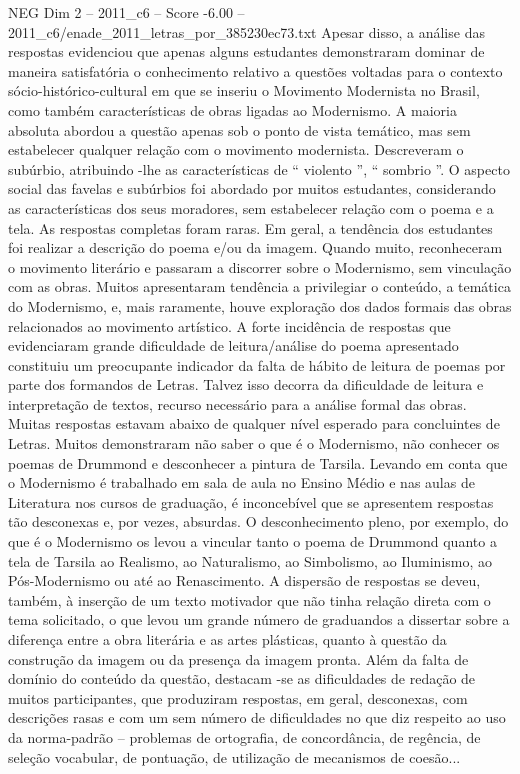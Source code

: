 \begin{textsample}{NEG Dim 2 – 2011\_c6 – Score -6.00 – 2011\_c6/enade\_2011\_letras\_por\_385230ec73.txt}
Apesar disso, a análise das respostas evidenciou que apenas alguns estudantes demonstraram dominar de maneira satisfatória o conhecimento relativo a questões voltadas para o contexto sócio-histórico-cultural em que se inseriu o Movimento Modernista no Brasil, como também características de obras ligadas ao Modernismo.
A maioria absoluta abordou a questão apenas sob o ponto de vista temático, mas sem estabelecer qualquer relação com o movimento modernista.
Descreveram o subúrbio, atribuindo -lhe as características de “ violento ”, “ sombrio ”.
O aspecto social das favelas e subúrbios foi abordado por muitos estudantes, considerando as características dos seus moradores, sem estabelecer relação com o poema e a tela.
As respostas completas foram raras.
Em geral, a tendência dos estudantes foi realizar a descrição do poema e/ou da imagem.
Quando muito, reconheceram o movimento literário e passaram a discorrer sobre o Modernismo, sem vinculação com as obras.
Muitos apresentaram tendência a privilegiar o conteúdo, a temática do Modernismo, e, mais raramente, houve exploração dos dados formais das obras relacionados ao movimento artístico.
A forte incidência de respostas que evidenciaram grande dificuldade de leitura/análise do poema apresentado constituiu um preocupante indicador da falta de hábito de leitura de poemas por parte dos formandos de Letras.
Talvez isso decorra da dificuldade de leitura e interpretação de textos, recurso necessário para a análise formal das obras.
Muitas respostas estavam abaixo de qualquer nível esperado para concluintes de Letras.
Muitos demonstraram não saber o que é o Modernismo, não conhecer os poemas de Drummond e desconhecer a pintura de Tarsila.
Levando em conta que o Modernismo é trabalhado em sala de aula no Ensino Médio e nas aulas de Literatura nos cursos de graduação, é inconcebível que se apresentem respostas tão desconexas e, por vezes, absurdas.
O desconhecimento pleno, por exemplo, do que é o Modernismo os levou a vincular tanto o poema de Drummond quanto a tela de Tarsila ao Realismo, ao Naturalismo, ao Simbolismo, ao Iluminismo, ao Pós-Modernismo ou até ao Renascimento.
A dispersão de respostas se deveu, também, à inserção de um texto motivador que não tinha relação direta com o tema solicitado, o que levou um grande número de graduandos a dissertar sobre a diferença entre a obra literária e as artes plásticas, quanto à questão da construção da imagem ou da presença da imagem pronta.
Além da falta de domínio do conteúdo da questão, destacam -se as dificuldades de redação de muitos participantes, que produziram respostas, em geral, desconexas, com descrições rasas e com um sem número de dificuldades no que diz respeito ao uso da norma-padrão – problemas de ortografia, de concordância, de regência, de seleção vocabular, de pontuação, de utilização de mecanismos de coesão...

\end{textsample}
